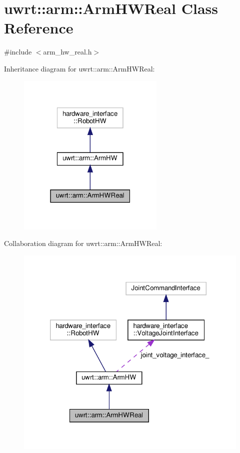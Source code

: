 \hypertarget{classuwrt_1_1arm_1_1_arm_h_w_real}{}\section{uwrt\+:\+:arm\+:\+:Arm\+H\+W\+Real Class Reference}
\label{classuwrt_1_1arm_1_1_arm_h_w_real}


{\ttfamily \#include $<$arm\+\_\+hw\+\_\+real.\+h$>$}



Inheritance diagram for uwrt\+:\+:arm\+:\+:Arm\+H\+W\+Real\+:
\nopagebreak
\begin{figure}[H]
\begin{center}
\leavevmode
\includegraphics[width=199pt]{classuwrt_1_1arm_1_1_arm_h_w_real__inherit__graph}
\end{center}
\end{figure}


Collaboration diagram for uwrt\+:\+:arm\+:\+:Arm\+H\+W\+Real\+:
\nopagebreak
\begin{figure}[H]
\begin{center}
\leavevmode
\includegraphics[width=320pt]{classuwrt_1_1arm_1_1_arm_h_w_real__coll__graph}
\end{center}
\end{figure}
